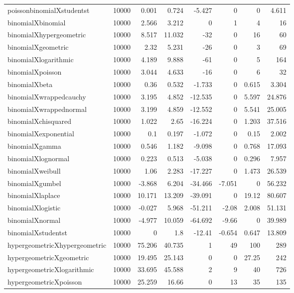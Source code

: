 \begin{table}[!htbp]
{\begin{tabular}{lrrrrrrr}
poissonbinomialXstudentst & 10000 & 0.001 & 0.724 & -5.427 & 0 & 0 & 4.611 \\ 
binomialXbinomial & 10000 & 2.566 & 3.212 & 0 & 1 & 4 & 16 \\ 
binomialXhypergeometric & 10000 & 8.517 & 11.032 & -32 & 0 & 16 & 60 \\ 
binomialXgeometric & 10000 & 2.32 & 5.231 & -26 & 0 & 3 & 69 \\ 
binomialXlogarithmic & 10000 & 4.189 & 9.888 & -61 & 0 & 5 & 164 \\ 
binomialXpoisson & 10000 & 3.044 & 4.633 & -16 & 0 & 6 & 32 \\ 
binomialXbeta & 10000 & 0.36 & 0.532 & -1.733 & 0 & 0.615 & 3.304 \\ 
binomialXwrappedcauchy & 10000 & 3.195 & 4.852 & -12.535 & 0 & 5.597 & 24.876 \\ 
binomialXwrappednormal & 10000 & 3.199 & 4.859 & -12.552 & 0 & 5.541 & 25.005 \\ 
binomialXchisquared & 10000 & 1.022 & 2.65 & -16.224 & 0 & 1.203 & 37.516 \\ 
binomialXexponential & 10000 & 0.1 & 0.197 & -1.072 & 0 & 0.15 & 2.002 \\ 
binomialXgamma & 10000 & 0.546 & 1.182 & -9.098 & 0 & 0.768 & 17.093 \\ 
binomialXlognormal & 10000 & 0.223 & 0.513 & -5.038 & 0 & 0.296 & 7.957 \\ 
binomialXweibull & 10000 & 1.06 & 2.283 & -17.227 & 0 & 1.473 & 26.539 \\ 
binomialXgumbel & 10000 & -3.868 & 6.204 & -34.466 & -7.051 & 0 & 56.232 \\ 
binomialXlaplace & 10000 & 10.171 & 13.209 & -39.091 & 0 & 19.12 & 80.607 \\ 
binomialXlogistic & 10000 & -0.027 & 5.968 & -51.211 & -2.08 & 2.008 & 51.131 \\ 
binomialXnormal & 10000 & -4.977 & 10.059 & -64.692 & -9.66 & 0 & 39.989 \\ 
binomialXstudentst & 10000 & 0 & 1.8 & -12.41 & -0.654 & 0.647 & 13.809 \\ 
hypergeometricXhypergeometric & 10000 & 75.206 & 40.735 & 1 & 49 & 100 & 289 \\ 
hypergeometricXgeometric & 10000 & 19.495 & 25.143 & 0 & 0 & 27.25 & 242 \\ 
hypergeometricXlogarithmic & 10000 & 33.695 & 45.588 & 2 & 9 & 40 & 726 \\ 
hypergeometricXpoisson & 10000 & 25.259 & 16.66 & 0 & 13 & 35 & 135 \\ 

\end{tabular}}
\end{table}
